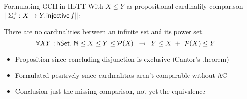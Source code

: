 \documentclass[xcolor=dvipsnames,compress,aspectratio=169,handout]{beamer}
\newcommand{\MBB}[1]{\ensuremath{\mathbb{#1}}\xspace}  %
\newcommand{\MCL}[1]{\ensuremath{\mathcal{#1}}\xspace} %
\newcommand{\Nat}{\MBB{N}}   %
\newcommand{\Pow}{\MCL P}
\begin{document}
\begin{frame}{Formulating GCH in HoTT}
	With $X\le Y$ as propositional cardinality comparison $||\Sigma f:X\to Y.\,\mathsf{injective}\,f||$:
	
	\pause
	\vspace{0.5cm}
	\begin{centering}
		\begin{widerbox}
			\center
			There are no cardinalities between an infinite set and its power set.
			$$\forall X Y:\hset.~\Nat \le X\le Y\le \Pow(X)~\,\to~\, Y\le X ~+~ \Pow(X)\le Y$$
		\end{widerbox}
	\end{centering}
	
	\vspace{0.5cm}
	\begin{itemize}
	 	\pause
		\item
		Proposition since concluding disjunction is exclusive (Cantor's theorem)
		\vspace{0.3cm}
		\pause
		\item
		Formulated positively since cardinalities aren't comparable without AC
		\vspace{0.3cm}
		\pause
		\item
		Conclusion just the missing comparison, not yet the equivalence
	\end{itemize}
\end{frame}
\end{document}
